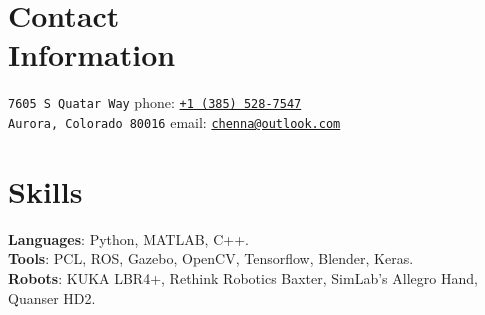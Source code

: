 \documentclass[letterpaper, margin, line, 10.5pt]{resume}
\begin{document}
\author{Kautilya Chenna}

\begin{resume}

    
    \section{\myheadingstyle Contact \\ Information}

    \texttt{7605 S Quatar Way}                            \hfill phone: \texttt{\href{tel:13855287547}{+1 (385) 528-7547}}          \vspace{0mm}\\\vspace{0mm}%
    \texttt{Aurora, Colorado 80016}                          \hfill email: \texttt{\href{mailto:chenna@outlook.com}{chenna@outlook.com}}       %


    
	\sectionseperator
	\section{\myheadingstyle Skills} 
	
	\textbf{Languages}: Python, MATLAB, C++. \\[1mm]
	\textbf{Tools}: PCL, ROS, Gazebo, OpenCV, Tensorflow, Blender, Keras. \\[1mm]
	\textbf{Robots}: KUKA LBR4+, Rethink Robotics Baxter, SimLab's Allegro Hand, Quanser HD2.%


    
    \sectionseperator

\end{resume}
\end{document}
